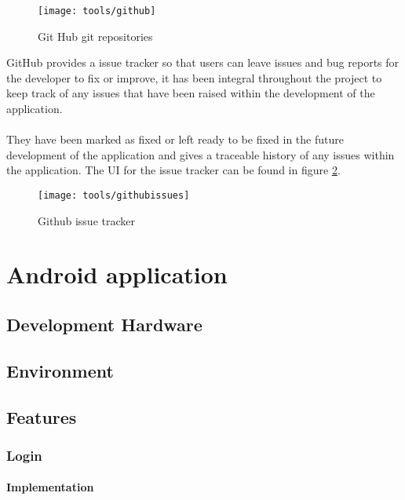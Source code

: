 \begin{figure}[H]
    \centering
    \texttt{[image: tools/github]}
    \caption{Git Hub git repositories}
    \label{fig:git_hub_repos_image}
\end{figure} 

\noindent
GitHub provides a issue tracker so that users can leave issues and bug reports for the developer to fix or improve, it has been integral throughout the project to keep track of any issues that have been raised within the development of the application.\\
\\
They have been marked as fixed or left ready to be fixed in the future development of the application and gives a traceable history of any issues within the application. The UI for the issue tracker can be found in figure \ref{fig:gh_issue_tracker_image}.

\begin{figure}[H]
    \centering
    \texttt{[image: tools/githubissues]}
    \caption{Github issue tracker}
    \label{fig:gh_issue_tracker_image}
\end{figure} 

\section{Android application}

\subsection{Development Hardware}

\subsection{Environment}

\subsection{Features}


\subsubsection*{Login}

\paragraph*{Implementation}


